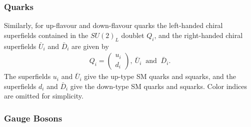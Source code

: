 \documentclass[twoside,english]{uiofysmaster}
\begin{document}
\subsubsection{Quarks}

Similarly, for up-flavour and down-flavour quarks the left-handed chiral superfields contained in the $SU(2)_L$ doublet $Q_i$,  and the right-handed chiral superfields $\bar{U}_i$ and $\bar{D}_i$ are given by
\begin{align}
Q_i = \begin{pmatrix}
u_i\\
d_i
\end{pmatrix},
~ \bar{U}_i ~ \text{ and }~ \bar{D}_i.
\end{align}
The superfields $u_i$ and $\bar{U}_i$ give the up-type SM quarks and squarks, and the superfields $d_i$ and $\bar{D}_i$ give the down-type SM quarks and squarks. Color indices are omitted for simplicity.

\subsubsection{Gauge Bosons}
\end{document}
